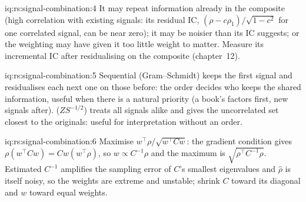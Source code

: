 \begin{solution}{iq:rs:signal-combination:4}
It may repeat information already in the composite (high correlation with existing signals: its residual IC, $(\rho - c\rho_1)/\sqrt{1 - c^2}$ for one
correlated signal, can be near zero); it may be noisier than its IC suggests; or the weighting may have given it too little weight to matter. Measure its
incremental IC after residualising on the composite (chapter~12).
\end{solution}

\begin{solution}{iq:rs:signal-combination:5}
Sequential (Gram--Schmidt)  keeps the first signal and residualises each next one on those before: the order decides who keeps the shared
information, useful when there is a natural priority (a book's factors first, new signals after).  ($ZS^{-1/2}$) treats all
signals alike and gives the uncorrelated set closest to the originals: useful for interpretation without an order.
\end{solution}

\begin{solution}{iq:rs:signal-combination:6}
Maximise $w^\top\rho/\sqrt{w^\top Cw}$: the gradient condition gives $\rho(w^\top Cw) = Cw(w^\top\rho)$, so $w \propto C^{-1}\rho$ and the maximum is
$\sqrt{\rho^\top C^{-1}\rho}$. Estimated $C^{-1}$ amplifies the sampling error of $C$'s smallest eigenvalues and $\hat\rho$ is itself noisy, so the
weights are extreme and unstable; shrink $C$ toward its diagonal and $w$ toward equal weights.
\end{solution}
